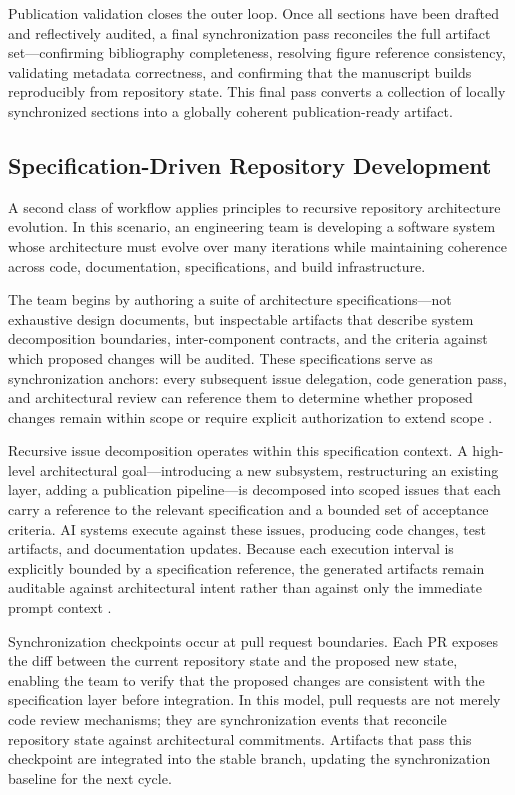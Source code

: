 Publication validation closes the outer loop. Once all sections have been drafted and reflectively audited, a final synchronization pass reconciles the full artifact set---confirming bibliography completeness, resolving figure reference consistency, validating metadata correctness, and confirming that the manuscript builds reproducibly from repository state. This final pass converts a collection of locally synchronized sections into a globally coherent publication-ready artifact.

\subsection{Specification-Driven Repository Development}

A second class of workflow applies  principles to recursive repository architecture evolution. In this scenario, an engineering team is developing a software system whose architecture must evolve over many iterations while maintaining coherence across code, documentation, specifications, and build infrastructure.

The team begins by authoring a suite of architecture specifications---not exhaustive design documents, but inspectable artifacts that describe system decomposition boundaries, inter-component contracts, and the criteria against which proposed changes will be audited. These specifications serve as synchronization anchors: every subsequent issue delegation, code generation pass, and architectural review can reference them to determine whether proposed changes remain within scope or require explicit authorization to extend scope \cite{Parnas1972Modularization,Chandy1985DistributedSnapshots}.

Recursive issue decomposition operates within this specification context. A high-level architectural goal---introducing a new subsystem, restructuring an existing layer, adding a publication pipeline---is decomposed into scoped issues that each carry a reference to the relevant specification and a bounded set of acceptance criteria. AI systems execute against these issues, producing code changes, test artifacts, and documentation updates. Because each execution interval is explicitly bounded by a specification reference, the generated artifacts remain auditable against architectural intent rather than against only the immediate prompt context \cite{Yang2024SWEAgent}.

Synchronization checkpoints occur at pull request boundaries. Each PR exposes the diff between the current repository state and the proposed new state, enabling the team to verify that the proposed changes are consistent with the specification layer before integration. In this model, pull requests are not merely code review mechanisms; they are synchronization events that reconcile repository state against architectural commitments. Artifacts that pass this checkpoint are integrated into the stable branch, updating the synchronization baseline for the next cycle.

